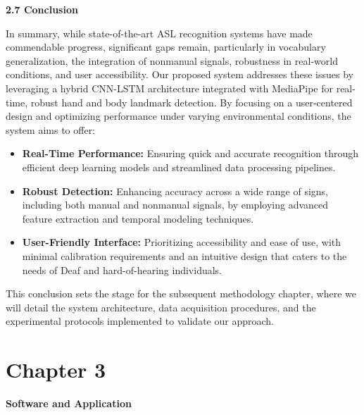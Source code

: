 \documentclass[12pt]{article}
\begin{document}
\vspace{1.5em}
\noindent
\textbf{2.7 Conclusion}
\vspace{1em}

In summary, while state-of-the-art ASL recognition systems have made commendable 
progress, significant gaps remain, particularly in vocabulary generalization, the integration of 
nonmanual signals, robustness in real-world conditions, and user accessibility. Our proposed 
system addresses these issues by leveraging a hybrid CNN-LSTM architecture integrated with 
MediaPipe for real-time, robust hand and body landmark detection. By focusing on 
a user-centered design and optimizing performance under varying environmental conditions, 
the system aims to offer:

\begin{itemize}
    \item \textbf{Real-Time Performance:}  
    Ensuring quick and accurate recognition through efficient deep learning models and 
    streamlined data processing pipelines.
    
    \item \textbf{Robust Detection:}  
    Enhancing accuracy across a wide range of signs, including both manual and nonmanual 
    signals, by employing advanced feature extraction and temporal modeling techniques.
    
    \item \textbf{User-Friendly Interface:}  
    Prioritizing accessibility and ease of use, with minimal calibration requirements and 
    an intuitive design that caters to the needs of Deaf and hard-of-hearing individuals.
\end{itemize}

This conclusion sets the stage for the subsequent methodology chapter, where we will 
detail the system architecture, data acquisition procedures, and the experimental protocols 
implemented to validate our approach.

\newpage
\section*{Chapter 3}
\begin{center}
\large \textbf{Software and Application}
\end{center}
\end{document}
